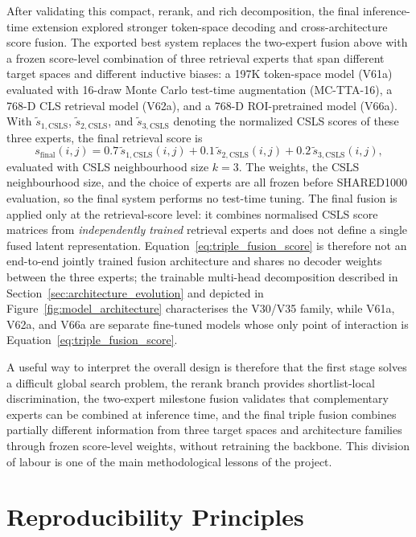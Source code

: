 After validating this compact, rerank, and rich decomposition, the final inference-time extension explored stronger token-space decoding and cross-architecture score fusion. The exported best system replaces the two-expert fusion above with a frozen score-level combination of three retrieval experts that span different target spaces and different inductive biases: a 197K token-space model (V61a) evaluated with 16-draw Monte Carlo test-time augmentation (MC-TTA-16), a 768-D CLS retrieval model (V62a), and a 768-D ROI-pretrained model (V66a). With $\widetilde{s}_{1,\mathrm{CSLS}}$, $\widetilde{s}_{2,\mathrm{CSLS}}$, and $\widetilde{s}_{3,\mathrm{CSLS}}$ denoting the normalized CSLS scores of these three experts, the final retrieval score is
\begin{equation}
s_{\mathrm{final}}(i,j) = 0.7\,\widetilde{s}_{1,\mathrm{CSLS}}(i,j) + 0.1\,\widetilde{s}_{2,\mathrm{CSLS}}(i,j) + 0.2\,\widetilde{s}_{3,\mathrm{CSLS}}(i,j),
\label{eq:triple_fusion_score}
\end{equation}
evaluated with CSLS neighbourhood size $k=3$. The weights, the CSLS neighbourhood size, and the choice of experts are all frozen before SHARED1000 evaluation, so the final system performs no test-time tuning. The final fusion is applied only at the retrieval-score level: it combines normalised CSLS score matrices from \emph{independently trained} retrieval experts and does not define a single fused latent representation. Equation~\eqref{eq:triple_fusion_score} is therefore not an end-to-end jointly trained fusion architecture and shares no decoder weights between the three experts; the trainable multi-head decomposition described in Section~\ref{sec:architecture_evolution} and depicted in Figure~\ref{fig:model_architecture} characterises the V30/V35 family, while V61a, V62a, and V66a are separate fine-tuned models whose only point of interaction is Equation~\eqref{eq:triple_fusion_score}.

A useful way to interpret the overall design is therefore that the first stage solves a difficult global search problem, the rerank branch provides shortlist-local discrimination, the two-expert milestone fusion validates that complementary experts can be combined at inference time, and the final triple fusion combines partially different information from three target spaces and architecture families through frozen score-level weights, without retraining the backbone. This division of labour is one of the main methodological lessons of the project.

\section{Reproducibility Principles}

